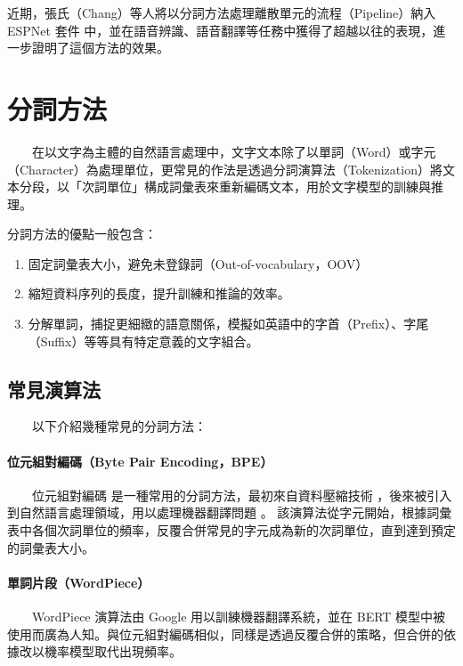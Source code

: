         近期，張氏（Chang）等人\cite{chang_exploring_2024}將以分詞方法處理離散單元的流程（Pipeline）納入 ESPNet 套件 \cite{watanabe2018espnet} 中，並在語音辨識、語音翻譯等任務中獲得了超越以往的表現，進一步證明了這個方法的效果。

\section{分詞方法}

　　在以文字為主體的自然語言處理中，文字文本除了以單詞（Word）或字元（Character）為處理單位，更常見的作法是透過分詞演算法（Tokenization）將文本分段，以「次詞單位」構成詞彙表來重新編碼文本，用於文字模型的訓練與推理。

        分詞方法的優點一般包含：

\begin{enumerate}
    \item 固定詞彙表大小，避免未登錄詞（Out-of-vocabulary，OOV）
    \item 縮短資料序列的長度，提升訓練和推論的效率。
    \item 分解單詞，捕捉更細緻的語意關係，模擬如英語中的字首（Prefix）、字尾（Suffix）等等具有特定意義的文字組合。
\end{enumerate}

\subsection{常見演算法}

　　以下介紹幾種常見的分詞方法：

\paragraph{位元組對編碼（Byte Pair Encoding，BPE）} \hfill \break
%
　　位元組對編碼 \cite{10.5555/177910.177914, sennrich_neural_2016} 是一種常用的分詞方法，最初來自資料壓縮技術 \cite{10.5555/177910.177914}，後來被引入到自然語言處理領域，用以處理機器翻譯問題 \cite{sennrich_neural_2016} 。
該演算法從字元開始，根據詞彙表中各個次詞單位的頻率，反覆合併常見的字元成為新的次詞單位，直到達到預定的詞彙表大小。

\paragraph{單詞片段（WordPiece）} \hfill \break
%
　　WordPiece \cite{wu2016google} 演算法由 Google 用以訓練機器翻譯系統，並在 BERT \cite{devlin_bert_2019} 模型中被使用而廣為人知。與位元組對編碼相似，同樣是透過反覆合併的策略，但合併的依據改以機率模型取代出現頻率。


